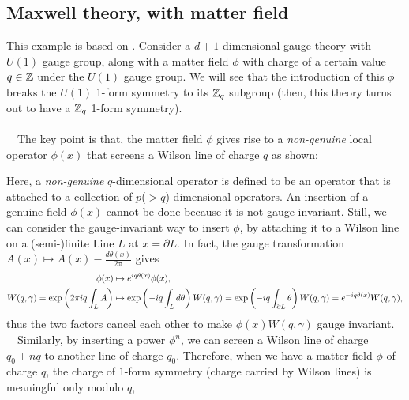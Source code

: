 \documentclass{ltjsarticle}
\theoremstyle{mystyle} %
\numberwithin{equation}{section}
\begin{document}
\subsection{Maxwell theory, with matter field}
This example is based on \cite{LBLBLFTLGDGAPHT}. 
Consider a $d+1$-dimensional gauge theory with $U(1)$ gauge group, along with a matter field $\phi$ with charge of a certain value $q\in \mathbb{Z}$ 
under the $U(1)$ gauge group. We will see that the introduction of this $\phi$ breaks the $U(1)$ 1-form symmetry to its $\mathbb{Z}_q$ subgroup 
(then, this theory turns out to have a $\mathbb{Z}_q$ 1-form symmetry). \\\\
　The key point is that, the matter field $\phi$ gives rise to a 
\textit{non-genuine} local operator $\phi(x)$ that screens a Wilson line of charge $q$ as shown: 
\begin{figure}[H]
    \centering
    \label{fig:label}
\end{figure}
Here, a \textit{non-genuine} $q$-dimensional operator is defined to be an operator that is attached to a collection of $p$($>q$)-dimensional operators. 
An insertion of a genuine field $\phi(x)$ cannot be done because it is not gauge invariant. 
Still, we can consider the gauge-invariant way to insert $\phi$, by attaching it to a Wilson line 
on a (semi-)finite Line $L$ at $x=\partial L$. 
In fact, the gauge transformation $A(x)\mapsto A(x)-\frac{d\theta(x)}{2\pi}$ gives
\begin{align}
    \phi(x)&\mapsto e^{iq\theta(x)}\phi(x), \\
    W(q, \gamma)=\exp\left({2\pi iq\int_L A}\right)&\mapsto \exp\left({- iq\int_L d\theta}\right)W(q, \gamma)
    =\exp\left({-iq\int_{\partial L} \theta}\right)W(q, \gamma)
    =e^{-iq\theta(x)}W(q, \gamma), \\
\end{align}
thus the two factors cancel each other to make $\phi(x)W(q, \gamma)$ gauge invariant. \\
　Similarly, by inserting a power $\phi^n$, we can screen a Wilson line of charge $q_0 + nq$ to another line of charge $q_0$. 
 Therefore, when we have a matter field $\phi$ of charge $q$, the charge of $1$-form symmetry (charge carried by Wilson lines) is meaningful only modulo $q$, 
\end{document}
